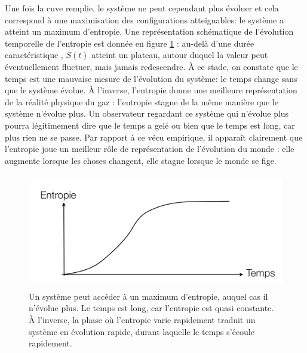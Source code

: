 Une fois la cuve remplie, le système ne peut cependant plus évoluer et cela correspond à une maximisation des configurations atteignables: le système a atteint un maximum d'entropie. Une représentation schématique de l'évolution temporelle de l'entropie est donnée en figure \ref{f:equitemps} : au-delà d'une durée caractéristique , $S(t)$ atteint un plateau, autour duquel la valeur peut éventuellement fluctuer, mais jamais redescendre. À ce stade, on constate que le temps est une mauvaise mesure de l'évolution du système: le temps change sans que le système évolue. À l'inverse, l'entropie donne une meilleure représentation de la réalité physique du gaz : l'entropie stagne de la même manière que le système n'évolue plus. Un observateur regardant ce système qui n'évolue plus pourra légitimement dire que le temps a gelé ou bien que le temps est long, car plus rien ne se passe. Par rapport à ce vécu empirique, il apparaît clairement que l'entropie joue un meilleur rôle de représentation de l'évolution du monde : elle augmente lorsque les choses changent, elle stagne lorsque le monde se fige. 
\begin{figure}[htbp]
	\centering
		\includegraphics[height=5cm]{figs/equientro.png}
	\caption[Évolution vers un maximum d'entropie]{Un système peut accéder à un maximum d'entropie, auquel cas il n'évolue plus. Le temps est long, car l'entropie est quasi constante. À l'inverse, la phase où l'entropie varie rapidement traduit un système en évolution rapide, durant laquelle le temps s'écoule rapidement.}
	\label{f:equitemps}
\end{figure}

